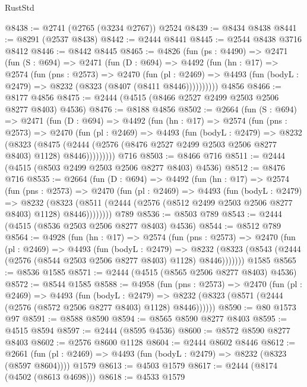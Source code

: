 \begin{lexlean}{RustStd}
\begin{coremodule}
@8438 := @2741 (@2765 (@3234 @2767)) @2524
@8439 := @8434 @8438
@8441 := @8291 (@2537 @8438)
@8442 := @2444 @8441
@8445 := @2544 @8438 @3716 @8412
@8446 := @8442 @8445
@8465 := @4826
    (fun (ps : @4490) =>
    @2471
      (fun (S : @694) =>
      @2471
        (fun (D : @694) =>
        @4492
          (fun (hn : @17) =>
          @2574
            (fun (pns : @2573) =>
            @2470
              (fun (pl : @2469) =>
              @4493 (fun (bodyL : @2479) => @8232 (@8323 (@8407 (@8411 @8446))))))))))
    @4856
@8466 := @8177 @4856
@8475 := @2444 (@4515 (@8466 @2527 @2499 @2503 @2506 @8277 @8403) @4536)
@8476 := @8188 @4856
@8502 := @2664
    (fun (S : @694) =>
    @2471
      (fun (D : @694) =>
      @4492
        (fun (hn : @17) =>
        @2574
          (fun (pns : @2573) =>
          @2470
            (fun (pl : @2469) =>
            @4493
              (fun (bodyL : @2479) =>
              @8232
                (@8323
                  (@8475
                    (@2444 (@2576 (@8476 @2527 @2499 @2503 @2506 @8277 @8403) @1128) @8446)))))))))
    @716
@8503 := @8466 @716
@8511 := @2444 (@4515 (@8503 @2499 @2503 @2506 @8277 @8403) @4536)
@8512 := @8476 @716
@8535 := @2664
    (fun (D : @694) =>
    @4492
      (fun (hn : @17) =>
      @2574
        (fun (pns : @2573) =>
        @2470
          (fun (pl : @2469) =>
          @4493
            (fun (bodyL : @2479) =>
            @8232
              (@8323 (@8511 (@2444 (@2576 (@8512 @2499 @2503 @2506 @8277 @8403) @1128) @8446))))))))
    @789
@8536 := @8503 @789
@8543 := @2444 (@4515 (@8536 @2503 @2506 @8277 @8403) @4536)
@8544 := @8512 @789
@8564 := @4928
    (fun (hn : @17) =>
    @2574
      (fun (pns : @2573) =>
      @2470
        (fun (pl : @2469) =>
        @4493
          (fun (bodyL : @2479) =>
          @8232 (@8323 (@8543 (@2444 (@2576 (@8544 @2503 @2506 @8277 @8403) @1128) @8446)))))))
    @1585
@8565 := @8536 @1585
@8571 := @2444 (@4515 (@8565 @2506 @8277 @8403) @4536)
@8572 := @8544 @1585
@8588 := @4958
    (fun (pns : @2573) =>
    @2470
      (fun (pl : @2469) =>
      @4493
        (fun (bodyL : @2479) =>
        @8232 (@8323 (@8571 (@2444 (@2576 (@8572 @2506 @8277 @8403) @1128) @8446))))))
@8590 := @80 @1573 @97
@8591 := @8588 @8590
@8594 := @8565 @8590 @8277 @8403
@8595 := @4515 @8594
@8597 := @2444 (@8595 @4536)
@8600 := @8572 @8590 @8277 @8403
@8602 := @2576 @8600 @1128
@8604 := @2444 @8602 @8446
@8612 := @2661
    (fun (pl : @2469) => @4493 (fun (bodyL : @2479) => @8232 (@8323 (@8597 @8604))))
    @1579
@8613 := @4503 @1579
@8617 := @2444 (@8174 (@4502 (@8613 @4698)))
@8618 := @4533 @1579

\end{coremodule}
\end{lexlean}
